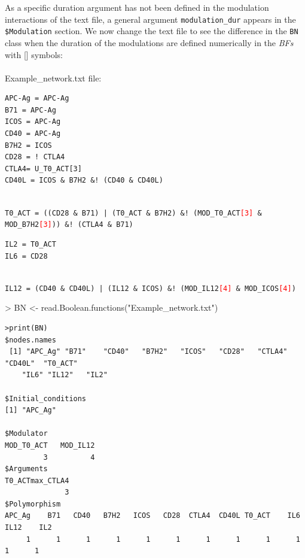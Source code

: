 \documentclass[a4paper]{article}
\begin{document}
As a specific duration argument has not been defined in the modulation interactions of the text file, a general argument \texttt{modulation\_dur} appears in the \texttt{\$Modulation} section.
We now change the text file to see the difference in the \texttt{BN} class when the duration of the modulations are defined numerically in the \emph{BFs} with [] symbols:
\\
\\ Example\_network.txt file:
\begin{framed}
\begin{BVerbatim}
APC-Ag = APC-Ag
B71 = APC-Ag
ICOS = APC-Ag
CD40 = APC-Ag
B7H2 = ICOS
CD28 = ! CTLA4
CTLA4= U_T0_ACT[3]
CD40L = ICOS & B7H2 &! (CD40 & CD40L)
\end{BVerbatim}
\\
\texttt{T0\_ACT = ((CD28 \& B71) | (T0\_ACT \& B7H2) \&! (MOD\_T0\_ACT\textcolor{red}{[3]} \& MOD\_B7H2\textcolor{red}{[3]})) \&! (CTLA4 \& B71)}\\
\begin{BVerbatim}
IL2 = T0_ACT
IL6 = CD28
\end{BVerbatim}
\\
\texttt{IL12 = (CD40 \& CD40L) | (IL12 \& ICOS) \&! (MOD\_IL12\textcolor{red}{[4]} \& MOD\_ICOS\textcolor{red}{[4]})}

\end{framed}


\begin{Schunk}
\begin{Sinput}
> BN <- read.Boolean.functions("Example_network.txt")
\end{Sinput}
\end{Schunk}
\begin{verbatim}
>print(BN)
$nodes.names
 [1] "APC_Ag" "B71"    "CD40"   "B7H2"   "ICOS"   "CD28"   "CTLA4"  "CD40L"  "T0_ACT" 
    "IL6" "IL12"   "IL2"
    
$Initial_conditions
[1] "APC_Ag"

$Modulator
MOD_T0_ACT   MOD_IL12 
         3          4 
$Arguments
T0_ACTmax_CTLA4 
              3 
$Polymorphism
APC_Ag    B71   CD40   B7H2   ICOS   CD28  CTLA4  CD40L T0_ACT    IL6   IL12    IL2 
     1      1      1      1      1      1      1      1      1      1      1      1 

\end{verbatim}
\end{document}
